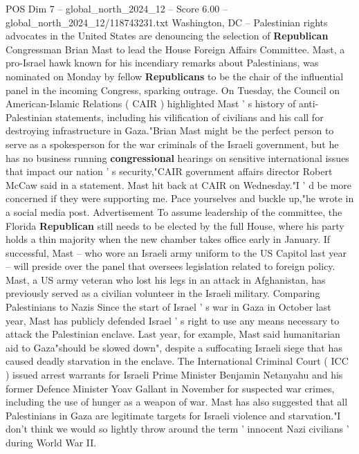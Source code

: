 \begin{textsample}{POS Dim 7 – global\_north\_2024\_12 – Score 6.00 – global\_north\_2024\_12/118743231.txt}  \label{ex:f7_pos_295}
Washington, DC -- Palestinian rights advocates in the United States are denouncing the selection of \textbf{Republican} Congressman Brian Mast to lead the House Foreign Affairs Committee.
Mast, a pro-Israel hawk known for his incendiary remarks about Palestinians, was nominated on Monday by fellow \textbf{Republicans} to be the chair of the influential panel in the incoming Congress, sparking outrage.
On Tuesday, the Council on American-Islamic Relations ( CAIR ) highlighted Mast ' s history of anti-Palestinian statements, including his vilification of civilians and his call for destroying infrastructure in Gaza."Brian Mast might be the perfect person to serve as a spokesperson for the war criminals of the Israeli government, but he has no business running \textbf{congressional} hearings on sensitive international issues that impact our nation ' s security,"CAIR government affairs director Robert McCaw said in a statement.
Mast hit back at CAIR on Wednesday."I ' d be more concerned if they were supporting me.
Pace yourselves and buckle up,"he wrote in a social media post.
Advertisement To assume leadership of the committee, the Florida \textbf{Republican} still needs to be elected by the full House, where his party holds a thin majority when the new chamber takes office early in January.
If successful, Mast -- who wore an Israeli army uniform to the US Capitol last year -- will preside over the panel that oversees legislation related to foreign policy.
Mast, a US army veteran who lost his legs in an attack in Afghanistan, has previously served as a civilian volunteer in the Israeli military.
Comparing Palestinians to Nazis Since the start of Israel ' s war in Gaza in October last year, Mast has publicly defended Israel ' s right to use any means necessary to attack the Palestinian enclave.
Last year, for example, Mast said humanitarian aid to Gaza"should be slowed down", despite a suffocating Israeli siege that has caused deadly starvation in the enclave.
The International Criminal Court ( ICC ) issued arrest warrants for Israeli Prime Minister Benjamin Netanyahu and his former Defence Minister Yoav Gallant in November for suspected war crimes, including the use of hunger as a weapon of war.
Mast has also suggested that all Palestinians in Gaza are legitimate targets for Israeli violence and starvation."I don't think we would so lightly throw around the term ' innocent Nazi civilians ' during World War II.

\end{textsample}

